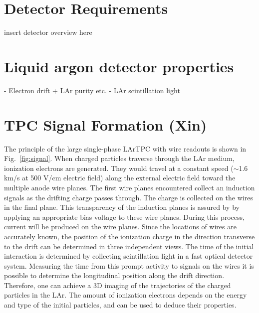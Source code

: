 
\section{Detector Requirements}

insert detector overview here

\section{Liquid argon detector properties}
- Electron drift + LAr purity etc.
- LAr scintillation light 

\section{TPC Signal Formation (Xin)}

The principle of the large single-phase LArTPC with wire readouts is shown in 
Fig.~\ref{fig:signal}. When charged particles traverse through the LAr medium,
ionization electrons are generated. They would travel at a constant speed 
($\sim$1.6 km/s at 500 V/cm electric field) along the external electric field 
toward the multiple anode wire planes. The first wire planes encountered collect 
an induction signals as the drifting charge passes through.  The charge is collected 
on the wires in the final plane. This transparency of the induction planes is assured by 
by applying an appropriate bias voltage to these wire planes.
During this process, current will be produced on the wire planes. 
Since the locations of wires are accurately known, the position of the
ionization charge in the direction transverse to the drift can be determined in 
three independent views. The time of the initial interaction is determined by collecting 
scintillation light 
in a fast optical detector system.
Measuring the time from this prompt activity to signals on the wires it is 
possible to determine the longitudinal position along the drift direction.
Therefore, one can achieve a 3D imaging of the trajectories of the charged particles in the LAr. 
The amount of ionization electrons depends on the energy and type of
the initial particles, and can be used to deduce their properties.

